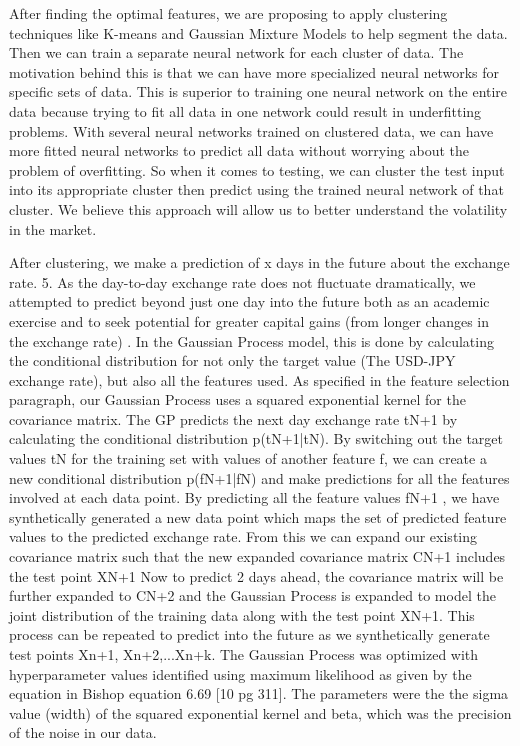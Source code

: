 \documentclass[twoside]{article}
\begin{document}
After finding the optimal features, we are proposing to apply clustering techniques like K-means and Gaussian Mixture Models to help segment the data. Then we can train a separate neural network for each cluster of data. The motivation behind this is that we can have more specialized neural networks for specific sets of data. This is superior to training one neural network on the entire data because trying to fit all data in one network could result in underfitting problems. With several neural networks trained on clustered data, we can have more fitted neural networks to predict all data without worrying about the problem of overfitting. So when it comes to testing, we can cluster the test input into its appropriate cluster then predict using the trained neural network of that cluster. We believe this approach will allow us to better understand the volatility in the market.

After clustering, we make a prediction of x days in the future about the exchange rate. 5. As the day-to-day exchange rate does not fluctuate dramatically, we attempted to predict beyond just one day into the future both as an academic exercise and to seek potential for greater capital gains (from longer changes in the exchange rate) . In the Gaussian Process model, this is done by calculating the conditional distribution for not only the target value (The USD-JPY exchange rate), but also all the features used. As specified in the feature selection paragraph, our Gaussian Process uses a squared exponential kernel for the covariance matrix. The GP predicts the next day exchange rate tN+1 by calculating the conditional distribution p(tN+1|tN). By switching out the target values tN for the training set with values of another feature f, we can create a new conditional distribution p(fN+1|fN) and make predictions for all the features involved at each data point. By predicting all the feature values fN+1 , we have synthetically generated a new data point which maps the set of predicted feature values to the predicted exchange rate. From this we can expand our existing covariance matrix such that the new expanded covariance matrix CN+1 includes the test point XN+1 Now to predict 2 days ahead, the covariance matrix will be further expanded to CN+2 and the Gaussian Process is expanded to model the joint distribution of the training data along with the test point XN+1. This process can be repeated to predict into the future as we synthetically generate test points Xn+1, Xn+2,...Xn+k. The Gaussian Process was optimized with hyperparameter values identified using maximum likelihood as given by the equation in Bishop equation 6.69 [10 pg 311]. The parameters were the the sigma value (width) of the squared exponential kernel and beta, which was the precision of the noise in our data.
\end{document}
